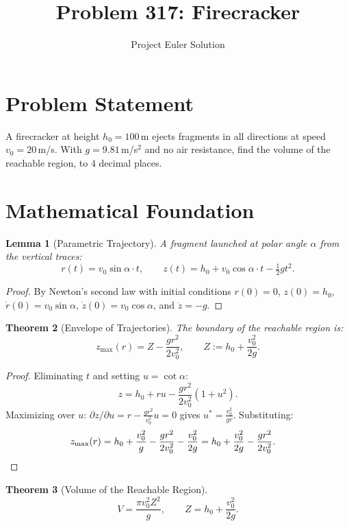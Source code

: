 \documentclass[12pt]{article}
\title{Problem 317: Firecracker}
\author{Project Euler Solution}
\date{}
\newtheorem{theorem}{Theorem}
\newtheorem{lemma}[theorem]{Lemma}
\begin{document}
\maketitle

\section{Problem Statement}

A firecracker at height $h_0 = 100$\,m ejects fragments in all directions at speed $v_0 = 20$\,m/s. With $g = 9.81$\,m/s$^2$ and no air resistance, find the volume of the reachable region, to 4 decimal places.

\section{Mathematical Foundation}

\begin{lemma}[Parametric Trajectory]
A fragment launched at polar angle $\alpha$ from the vertical traces:
\[
    r(t) = v_0 \sin\alpha \cdot t, \qquad z(t) = h_0 + v_0\cos\alpha \cdot t - \tfrac{1}{2}gt^2.
\]
\end{lemma}

\begin{proof}
By Newton's second law with initial conditions $r(0)=0$, $z(0)=h_0$, $\dot{r}(0) = v_0\sin\alpha$, $\dot{z}(0) = v_0\cos\alpha$, and $\ddot{z} = -g$.
\end{proof}

\begin{theorem}[Envelope of Trajectories]
The boundary of the reachable region is:
\[
    z_{\max}(r) = Z - \frac{gr^2}{2v_0^2}, \qquad Z := h_0 + \frac{v_0^2}{2g}.
\]
\end{theorem}

\begin{proof}
Eliminating $t$ and setting $u = \cot\alpha$:
\[
    z = h_0 + ru - \frac{gr^2}{2v_0^2}(1+u^2).
\]
Maximizing over $u$: $\partial z/\partial u = r - \frac{gr^2}{v_0^2}u = 0$ gives $u^* = \frac{v_0^2}{gr}$. Substituting:
\begin{align*}
    z_{\max}(r) &= h_0 + \frac{v_0^2}{g} - \frac{gr^2}{2v_0^2} - \frac{v_0^2}{2g} = h_0 + \frac{v_0^2}{2g} - \frac{gr^2}{2v_0^2}. \qedhere
\end{align*}
\end{proof}

\begin{theorem}[Volume of the Reachable Region]
\[
    V = \frac{\pi v_0^2 Z^2}{g}, \qquad Z = h_0 + \frac{v_0^2}{2g}.
\]
\end{theorem}
\end{document}
